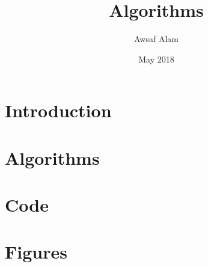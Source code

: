 \documentclass{article}
\title{Algorithms}
\author{Awsaf Alam }
\date{May 2018}
\begin{document}
\maketitle

\newpage
\tableofcontents
\newpage

\section{Introduction}



\section{Algorithms}



\section{Code}


\section{Figures}

\end{document}
